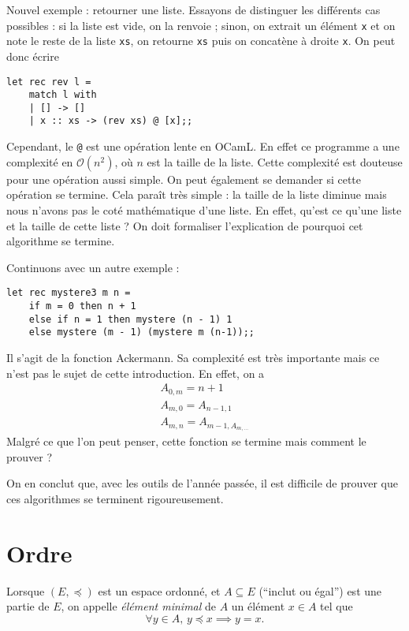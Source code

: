 Nouvel exemple : retourner une liste. Essayons de distinguer les différents cas possibles : si la liste est vide, on la renvoie ; sinon, on extrait un élément {\tt x} et on note le reste de la liste {\tt xs}, on retourne {\tt xs} puis on concatène à droite {\tt x}. On peut donc écrire
\begin{lstlisting}[language=caml, caption=Inverser une liste]
let rec rev l =
	match l with
	| [] -> []
	| x :: xs -> (rev xs) @ [x];;
\end{lstlisting}
Cependant, le {\tt @} est une opération lente en OCamL. En effet ce programme a une complexité en $\mathcal{O}(n^2)$, où $n$\/ est la taille de la liste. Cette complexité est douteuse pour une opération aussi simple.
On peut également se demander si cette opération se termine.
Cela paraît très simple : la taille de la liste diminue mais nous n'avons pas le coté mathématique d'une liste. En effet, qu'est ce qu'une liste et la taille de cette liste ?
On doit formaliser l'explication de pourquoi cet algorithme se termine.

Continuons avec un autre exemple :
\begin{lstlisting}[language=caml, caption=Un programme mystère (3)]
let rec mystere3 m n =
	if m = 0 then n + 1
	else if n = 1 then mystere (n - 1) 1
	else mystere (m - 1) (mystere m (n-1));;
\end{lstlisting}
Il s'agit de la fonction {\sc Ackermann}. Sa complexité est très importante mais ce n'est pas le sujet de cette introduction. En effet, on a
\begin{gather*}
	A_{0,m} = n + 1\\
	A_{m,0} = A_{n-1, 1}\\
	A_{m,n} = A_{m-1,A_{m,\ldots}}
\end{gather*}
Malgré ce que l'on peut penser, cette fonction se termine mais comment le prouver ?


On en conclut que, avec les outils de l'année passée, il est difficile de prouver que ces algorithmes se terminent rigoureusement.

\section{Ordre}

\begin{defn}
	Lorsque $(E, \preceq)$\/ est un espace ordonné, et $A \subseteq E$\/ (``inclut ou égal'') est une partie de $E$, on appelle {\it élément minimal}\/ de $A$\/ un élément $x \in A$\/ tel que \[
	\forall y \in A,\,y \preceq x \implies y = x
.\]
\end{defn}

